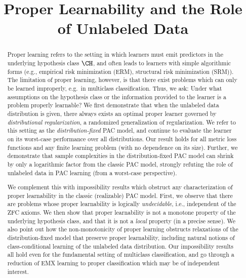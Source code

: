 \documentclass[11pt]{article}
\title{Proper Learnability and the Role of Unlabeled Data}
\author{
\and \and \and Julian Asilis \\ USC \\ \email{asilis@usc.edu} \and 
Siddartha Devic \\ USC\\ \email{devic@usc.edu} \and 
Shaddin Dughmi \\ USC  \\ \email{shaddin@usc.edu}  \and \and \and \and 
Vatsal Sharan \\ USC\\ \email{vsharan@usc.edu} \and 
Shang-Hua Teng \\ USC\\ \email{shanghua@usc.edu}
}
\date{}
\begin{document}
\maketitle

\begin{abstract}
Proper learning refers to the setting in which learners must emit predictors in the underlying hypothesis class $\CH$, and often leads to learners with simple algorithmic forms (e.g., empirical risk minimization (ERM), structural risk minimization (SRM)). The limitation of proper learning, however, is that there exist problems which can only be learned improperly, e.g.\ in multiclass classification. 
Thus, we ask: Under what assumptions on the hypothesis class or the information provided to the learner is a problem properly learnable? We first demonstrate that when the unlabeled data distribution is given, there always exists an optimal proper learner governed by \emph{distributional regularization}, a randomized generalization of regularization. We refer to this setting as the \emph{distribution-fixed} PAC model, and continue to evaluate the learner on its worst-case performance over all distributions. Our result holds for all metric loss functions and any finite learning problem (with no dependence on its size). Further, we demonstrate that sample complexities in the distribution-fixed PAC model can shrink by only a logarithmic factor from the classic PAC model, strongly refuting the role of unlabeled data in PAC learning (from a worst-case perspective). 

We complement this with impossibility results which obstruct any characterization of proper learnability in the classic (realizable) PAC model. First, we observe that there are problems whose proper learnability is logically \emph{undecidable}, i.e., independent of the ZFC axioms. We then show that proper learnability is not a monotone property of the underlying hypothesis class, and that it is not a \emph{local} property (in a precise sense). We also point out how the non-monotonicity of proper learning obstructs relaxations of the distribution-fixed model that preserve proper learnability, including natural notions of class-conditional learning of the unlabeled data distribution.  Our impossibility results all hold even for the fundamental setting of multiclass classification, and go through a reduction of EMX learning \citep{ben2019learnability} to proper classification which may be of independent interest.
\end{abstract}
\end{document}
